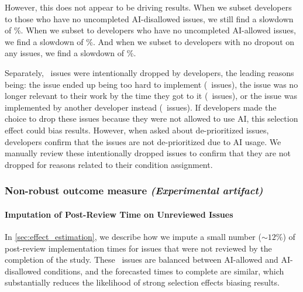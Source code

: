 \documentclass{article}
\begin{document}
However, this does not appear to be driving results. When we subset developers to those who have no uncompleted AI-disallowed issues, we still find a slowdown of \PctSpeedupDevelopersDroppedNoAIIssues\%. When we subset to developers who have no uncompleted AI-allowed issues, we find a slowdown of \PctSpeedupDevelopersDidNotDropAIIssues\%. And when we subset to developers with no dropout on any issues, we find a slowdown of \PctSpeedupDevelopersDidNotAnyIssues\%. 

Separately, \NumIssuesInvalidOtherReasons\ issues were intentionally dropped by developers, the leading reasons being: the issue ended up being too hard to implement (\NumIssuesInvalidDitchedTooHard\ issues), the issue was no longer relevant to their work by the time they got to it (\NumIssuesInvalidDitchedNotRelevant\ issues), or the issue was implemented by another developer instead (\NumIssuesInvalidTakenByOtherMaintainer\ issues). If developers made the choice to drop these issues because they were not allowed to use AI, this selection effect could bias results. However, when asked about de-prioritized issues, developers confirm that the issues are not de-prioritized due to AI usage. We manually review these intentionally dropped issues to confirm that they are not dropped for reasons related to their condition assignment.





\subsubsection{Non-robust outcome measure \textnormal{\textit{(Experimental artifact)}}}
\label{sec:factor-specific-outcome-measure}


\paragraph*{Imputation of Post-Review Time on Unreviewed Issues}
\label{sec:imputation_robustness}

In \autoref{sec:effect_estimation}, we describe how we impute a small number ($\sim 12\%$) of post-review implementation times for issues that were not reviewed by the completion of the study. These \NumIssuesInitialImplementationStartedButNotFinished\ issues are balanced between AI-allowed and AI-disallowed conditions, and the forecasted times to complete are similar, which substantially reduces the likelihood of strong selection effects biasing results.
\end{document}
